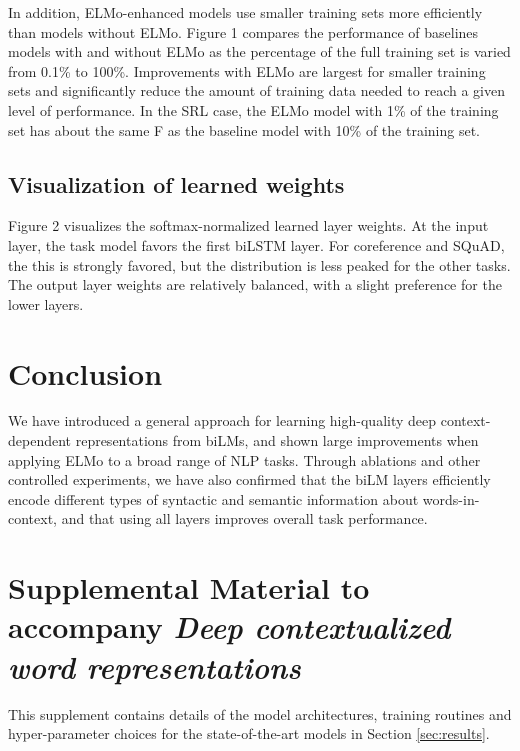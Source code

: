 \documentclass[11pt,a4paper]{article}
\newcommand{\ELMO}{ELMo}
\begin{document}
In addition, \ELMO{}-enhanced models use smaller training sets more efficiently than models without \ELMO.
Figure 1 compares the performance of baselines models with and without \ELMO{} as the percentage of the full training set is varied from 0.1\% to 100\%.
Improvements with \ELMO{} are largest for smaller training sets and significantly reduce the amount of training data needed to reach a given level of performance.
In the SRL case, the \ELMO{} model with 1\% of the training set has about the same F as the baseline model with 10\% of the training set.


\subsection{Visualization of learned weights}
\label{sec:visualize_weights}
Figure 2 visualizes the softmax-normalized learned layer weights. At the input layer, the task model favors the first biLSTM layer.
For coreference and SQuAD, the this is strongly favored, but the distribution is less peaked for the other tasks.
The output layer weights are relatively balanced, with a slight preference for the lower layers.




\section{Conclusion}  We have introduced a general approach for learning high-quality deep context-dependent representations from biLMs, and shown large improvements when applying \ELMO{} to a broad range of NLP tasks.
Through ablations and other controlled experiments, we have also confirmed that the biLM layers efficiently encode different types of syntactic and semantic information about words-in-context, and that using all layers improves overall task performance.













\clearpage
\appendix
\setcounter{page}{1}
\section{Supplemental Material to accompany {\em Deep contextualized word representations}}

This supplement contains details of the model architectures, training routines and hyper-parameter choices for the state-of-the-art models in Section \ref{sec:results}.
\end{document}
